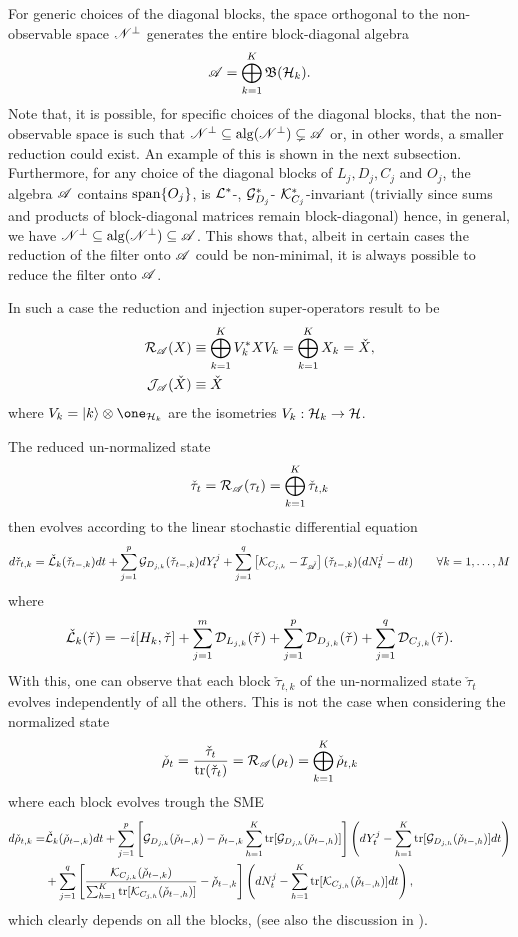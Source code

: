 \documentclass[aihp,12pt]{imsart}
\begin{document}
For generic choices of the diagonal blocks, the space orthogonal to the non-observable space $\mathscr{N}^\perp$ generates the entire block-diagonal algebra
\[\mathscr{A} = \bigoplus_{k=1}^K \mathfrak{B}(\mathcal{H}_k).\]
Note that, it is possible, for specific choices of the diagonal blocks, that the non-observable space is such that $\mathscr{N}^\perp\subseteq{\rm alg}(\mathscr{N}^\perp)\subsetneq\mathscr{A}$ or, in other words, a smaller reduction could exist. An example of this is shown in the next subsection.
Furthermore, for any choice of the diagonal blocks of $L_j,D_j,C_j$ and $O_j$, the algebra $\mathscr{A}$ contains ${\rm span}\{O_j\}$, is $\mathcal{L}^*$-, $\mathcal{G}_{D_j}^*$- $\mathcal{K}^*_{C_j}$-invariant (trivially since sums and products of block-diagonal matrices remain block-diagonal) hence, in general, we have $\mathscr{N}^\perp \subseteq {\rm alg}(\mathscr{N}^\perp) \subseteq \mathscr{A}$. This shows that, albeit in certain cases the reduction of the filter onto $\mathscr{A}$ could be non-minimal, it is always possible to reduce the filter onto $\mathscr{A}$. 

In such a case the reduction and injection super-operators result to be 
\begin{align*}
    \mathcal{R}_{\mathscr{A}}(X) &\equiv \bigoplus_{k=1}^K V_k^* X V_k = \bigoplus_{k=1}^K X_k = \check{X},\\
    \mathcal{J}_{\mathscr{A}}(\check{X}) &\equiv \check{X}
\end{align*}
where $V_k = \ket{k} \otimes \one_{\Hc_k}$ are the isometries $V_k:\mathcal{H}_k\to\mathcal{H}$. 

The reduced un-normalized state $$\check{\tau}_t = \mathcal{R}_{\mathscr{A}}(\tau_t) = \bigoplus_{k=1}^K \check{\tau}_{t,k}$$ then evolves according to the linear stochastic differential equation 
\begin{align*}
    d\check{\tau}_{t,k} = \check{\mathcal{L}}_{k}(\check{\tau}_{t-,k})dt + \sum_{j=1}^{p}\mathcal{G}_{{D}_{j,k}}(\check{\tau}_{t-,k}) dY_t^j +\sum_{j=1}^q \left[\mathcal{K}_{{C}_{j,k}}-\mathcal{I}_{\check{\mathscr{A}}}\right](\check{\tau}_{t-,k}) (dN_t^j-dt)  \qquad \forall k=1,\dots,M
\end{align*}
where 
\[\check{\mathcal{L}}_{k}(\check{\tau}) = -i[H_k,\check{\tau}] + \sum_{j=1}^{m}\mathcal{D}_{L_{j,k}}(\check{\tau}) + \sum_{j=1}^{p}\mathcal{D}_{D_{j,k}}(\check{\tau}) + \sum_{j=1}^{q}\mathcal{D}_{C_{j,k}}(\check{\tau}).\]
With this, one can observe that each block $\check{\tau}_{t,k}$ of the un-normalized state $\check{\tau}_{t}$ evolves independently of all the others. This is not the case when considering the normalized state $$\check{\rho}_t = \frac{\check{\tau}_t}{{\rm tr}(\check{\tau}_t)}= \mathcal{R}_{\mathscr{A}}(\rho_t) = \bigoplus_{k=1}^K \check{\rho}_{t,k}$$ where each block evolves trough the SME 
\begin{align*}
        d\check{\rho}_{t,k} = & \check{\mathcal{L}}_k(\check{\rho}_{t-,k}) dt + \sum_{j=1}^{p} \left[ \mathcal{G}_{D_{j,k}}(\check{\rho}_{t-,k}) - \check{\rho}_{t-,k}\sum_{h=1}^K{\rm tr}[\mathcal{G}_{D_{j,h}}(\check{\rho}_{t-,h})] \right] \left(dY_t^j - \sum_{h=1}^K{\rm tr}[\mathcal{G}_{D_{j,h}}(\check{\rho}_{t-,h})] dt\right)\\ & +  \sum_{j=1}^{q}\left[\frac{\mathcal{K}_{C_{j,k}}(\check{\rho}_{t-,k})}{\sum_{h=1}^K{\rm tr}[\mathcal{K}_{C_{j,h}}(\check{\rho}_{t-,h})]}-\check{\rho}_{t-,k}\right]\left(dN_t^j-\sum_{h=1}^K{\rm tr}[\mathcal{K}_{C_{j,h}}(\check{\rho}_{t-,h})]dt\right),
\end{align*}
which clearly depends on all the blocks, (see also the discussion in \cite{amini2021asymptotic}).
\end{document}
